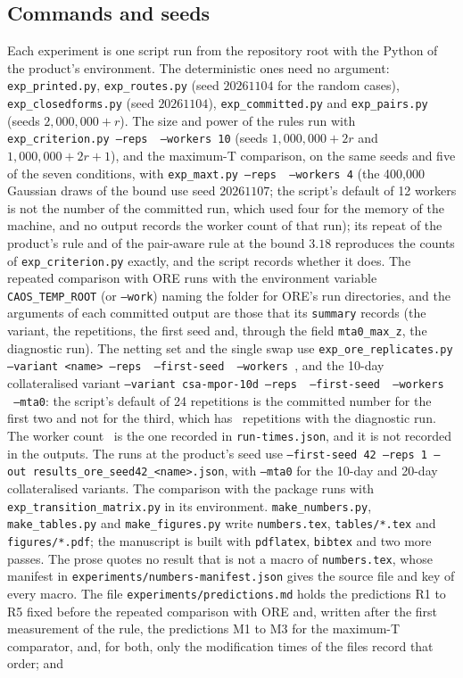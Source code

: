 \subsection{Commands and seeds}
\label{sec:repro-commands}

Each experiment is one script run from the repository root with the Python of the product's environment. The deterministic ones need no argument: \texttt{exp\_printed.py}, \texttt{exp\_routes.py} (seed $20261104$ for the random cases), \texttt{exp\_closedforms.py} (seed $20261104$), \texttt{exp\_committed.py} and \texttt{exp\_pairs.py} (seeds $2{,}000{,}000+r$). The size and power of the rules run with \texttt{exp\_criterion.py --reps \nCritReps\ --workers 10} (seeds $1{,}000{,}000+2r$ and $1{,}000{,}000+2r+1$), and the maximum-T comparison, on the same seeds and five of the seven conditions, with \texttt{exp\_maxt.py --reps \nMaxtReps\ --workers 4} (the 400,000 Gaussian draws of the bound use seed $20261107$; the script's default of 12 workers is not the number of the committed run, which used four for the memory of the machine, and no output records the worker count of that run); its repeat of the product's rule and of the pair-aware rule at the bound $3.18$ reproduces the counts of \texttt{exp\_criterion.py} exactly, and the script records whether it does. The repeated comparison with ORE runs with the environment variable \texttt{CAOS\_TEMP\_ROOT} (or \texttt{--work}) naming the folder for ORE's run directories, and the arguments of each committed output are those that its \texttt{summary} records (the variant, the repetitions, the first seed and, through the field \texttt{mta0\_max\_z}, the diagnostic run). The netting set and the single swap use \texttt{exp\_ore\_replicates.py --variant <name> --reps \nOreRepsNet\ --first-seed \nOreFirstSeed\ --workers \nOreWorkers}, and the 10-day collateralised variant \texttt{--variant csa-mpor-10d --reps \nOreRepsCsa\ --first-seed \nOreFirstSeed\ --workers \nOreWorkers\ --mta0}: the script's default of 24 repetitions is the committed number for the first two and not for the third, which has \nOreRepsCsa\ repetitions with the diagnostic run. The worker count \nOreWorkers\ is the one recorded in \texttt{run-times.json}, and it is not recorded in the outputs. The runs at the product's seed use \texttt{--first-seed 42 --reps 1 --out results\_ore\_seed42\_<name>.json}, with \texttt{--mta0} for the 10-day and 20-day collateralised variants. The comparison with the package runs with \texttt{exp\_transition\_matrix.py} in its environment. \texttt{make\_numbers.py}, \texttt{make\_tables.py} and \texttt{make\_figures.py} write \texttt{numbers.tex}, \texttt{tables/*.tex} and \texttt{figures/*.pdf}; the manuscript is built with \texttt{pdflatex}, \texttt{bibtex} and two more passes. The prose quotes no result that is not a macro of \texttt{numbers.tex}, whose manifest in \texttt{experiments/numbers-manifest.json} gives the source file and key of every macro. The file \texttt{experiments/predictions.md} holds the predictions R1 to R5 fixed before the repeated comparison with ORE and, written after the first measurement of the rule, the predictions M1 to M3 for the maximum-T comparator, and, for both, only the modification times of the files record that order; and 